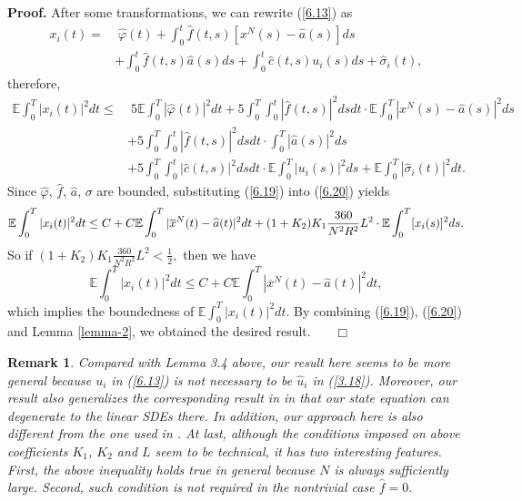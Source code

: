 \documentclass[11pt]{article}
\newenvironment{proof}[1][Proof]{\noindent \textbf{#1.} }{\ \ \  $\Box$}
\newtheorem{remark}{Remark}[section]
\def\dbE{\mathbb{E}}
\begin{document}
\begin{proof}
%
After some transformations, we can rewrite (\ref{6.13}) as
%
\begin{align*}
x_{i}(t) = & \; \widehat{\varphi }(t)+\int_{0}^{t}\widehat{f}(t,s)[x^{N}(s)-\widehat{a}(s)]ds \\
& +\int_{0}^{t}\widehat{f}(t,s)\widehat{a}(s)ds+\int_{0}^{t}\widehat{c}(t,s)u_{i}(s)ds+\widehat{\sigma }_{i}(t),
\end{align*}
%
therefore,
%
\begin{align}
\dbE\int_{0}^{T}|x_{i}(t)|^{2}dt
\leq & \; 5\dbE\int_{0}^{T}|\widehat{\varphi }(t)|^{2}dt+5\int_{0}^{T}\int_{0}^{t}|\widehat{f}(t,s)|^{2}dsdt\cdot\dbE\int_{0}^{T}|x^{N}(s)-\widehat{a}(s)|^{2}ds \nonumber \\
& +5\int_{0}^{T}\int_{0}^{t}|\widehat{f}(t,s)|^2dsdt\cdot \int_{0}^{T}|\widehat{a}(s)|^{2}ds \nonumber \\
& +5\int_{0}^{T}\int_{0}^{t}|\widehat{c}(t,s)|^{2}dsdt\cdot\dbE\int_{0}^{T}|u_{i}(s)|^{2}ds+\dbE\int_{0}^{T}|\widehat{\sigma}_{i}(t)|^{2}dt. \label{6.20}
\end{align}
%
Since $\widehat{\varphi}$, $\widehat{f}$, $\widehat{a}$, $\sigma$
are bounded, substituting (\ref{6.19}) into (\ref{6.20}) yields
\begin{eqnarray*}
\dbE\int_{0}^{T}|x_{i}(t)|^{2}dt\leq C+C\dbE\int_{0}^{T}|\overline{%
x}^{N}(t)-\widehat{a}(t)|^{2}dt+
(1+K_2)K_1\frac{360}{N^{2}R^2}L^2\cdot
\dbE\int_{0}^{T}[x_{i}(s)]^{2}ds.
\end{eqnarray*}
%
So if $(1+K_2)K_1\frac{360}{N^{2}R^2}L^2<\frac 1 2,$ then we have
\[
\dbE\int_{0}^{T}|x_{i}(t)|^{2}dt\leq C+C\dbE\int_{0}^{T}|\overline{x}^{N}(t)-%
\widehat{a}(t)|^{2}dt,
\]
which implies the boundedness of $\dbE\int_{0}^{T}|x_{i}(t)|^{2}dt$.
By combining (\ref{6.19}), (\ref{6.20}) and Lemma \ref{lemma-2}, we obtained the desired result.
\hfill
\end{proof}
\begin{remark}
Compared with Lemma 3.4 above, our result here seems to be more
general because $u_i$ in (\ref{6.13}) is not necessary to be
$\widehat{u}_i$ in (\ref{3.18}). Moreover, our result also
generalizes the corresponding result in \cite{N-H 2012} in
that our state equation can degenerate to the linear SDEs there.
In addition, our approach here is also different from the
one used in \cite{N-H 2012}. At last, although the conditions imposed on above coefficients $K_1$, $K_2$ and $L$ seem to be technical, it
has two interesting features. First, the above inequality holds true in general because $N$ is always sufficiently large. Second,
such condition is not required in the nontrivial case $\widehat{f}=0.$
\end{remark}
\end{document}
